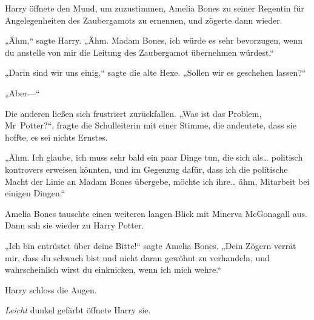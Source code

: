Harry öffnete den Mund, um zuzustimmen, Amelia Bones zu seiner Regentin für Angelegenheiten des Zaubergamots zu ernennen, und zögerte dann wieder.

„Ähm,“ sagte Harry. „Ähm. Madam Bones, ich würde es sehr bevorzugen, wenn du anstelle von mir die Leitung des Zaubergamot übernehmen würdest.“

„Darin sind wir uns einig,“ sagte die alte Hexe. „Sollen wir es geschehen lassen?“

„Aber—“

Die anderen ließen sich frustriert zurückfallen.
„Was ist das Problem, Mr~Potter?“, fragte die Schulleiterin mit einer Stimme, die andeutete, dass sie hoffte, es sei nichts Ernstes.

„Ähm. Ich glaube, ich muss sehr bald ein paar Dinge tun, die sich als… politisch kontrovers erweisen könnten, und im Gegenzug dafür, dass ich die politische Macht der Linie an Madam Bones übergebe, möchte ich ihre… ähm, Mitarbeit bei einigen Dingen.“

Amelia Bones tauschte einen weiteren langen Blick mit Minerva McGonagall aus.
Dann sah sie wieder zu Harry Potter.

„Ich bin entrüstet über deine Bitte!“ sagte Amelia Bones. „Dein Zögern verrät mir, dass du schwach bist und nicht daran gewöhnt zu verhandeln, und wahrscheinlich wirst du einknicken, wenn ich mich wehre.“

Harry schloss die Augen.

\emph{Leicht} dunkel gefärbt öffnete Harry sie.

